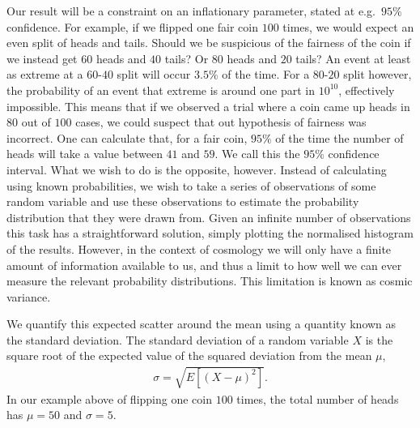     Our result will be a constraint on an inflationary parameter, stated at e.g.\ $95\%$ confidence.
    For example, if we flipped one fair coin $100$ times, we would expect an even split of heads
    and tails. Should we be suspicious of the fairness of the coin if we instead get $60$ heads
    and $40$ tails? Or $80$ heads and $20$ tails? An event at least as extreme at a $60$-$40$ split
    will occur $3.5\%$ of the time. For a $80$-$20$ split however, the probability of an event that
    extreme is around one part in $10^{10}$, effectively impossible. This means that if we observed
    a trial where a coin came up heads in $80$ out of $100$ cases, we could suspect that out hypothesis
    of fairness was incorrect.
    One can calculate that, for a fair coin, $95\%$ of the time the number of heads will take a value
    between $41$ and $59$. We call this the $95\%$ confidence interval.
    What we wish to do is the opposite, however. Instead of calculating using known probabilities,
    we wish to take a series of observations of some random variable and use these observations
    to estimate the probability distribution that they were drawn from. Given an infinite number
    of observations this task has a straightforward solution, simply plotting the normalised
    histogram of the results. However, in the context of cosmology we will only have a finite amount
    of information available to us, and thus a limit to how well we can ever measure the relevant
    probability distributions. This limitation is known as cosmic variance.



    We quantify this expected scatter around the mean using a quantity known as the standard deviation.
    The standard deviation of a random variable $X$ is the square root of the expected value of the
    squared deviation from the mean $\mu$,
    \begin{align}
        \sigma = \sqrt{E\left[{(X-\mu)}^2\right]}.
    \end{align}
    In our example above of flipping one coin $100$ times, the total number of heads has $\mu=50$
    and $\sigma=5$.

